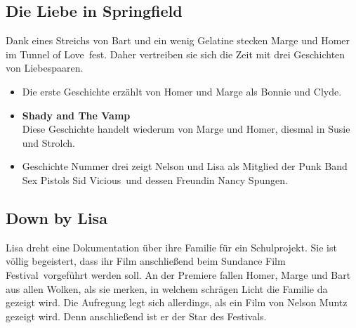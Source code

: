 

\subsection{Die Liebe in Springfield}
Dank eines Streichs von Bart und ein wenig Gelatine stecken Marge und Homer im \glqq Tunnel of Love\grqq\ fest. Daher vertreiben sie sich die Zeit mit drei Geschichten von Liebespaaren.
\begin{itemize}
	\item Die erste Geschichte erzählt von Homer und Marge als \glqq Bonnie und Clyde\grqq .
	\item \textbf{Shady and The Vamp}\\ Diese Geschichte handelt wiederum von Marge und Homer, diesmal in \glqq Susie und Strolch\grqq .
	\item Geschichte Nummer drei zeigt Nelson und Lisa als Mitglied der Punk Band Sex Pistols \glqq Sid Vicious\grqq\ und dessen Freundin \glqq Nancy Spungen\grqq . 
\end{itemize}


\subsection{Down by Lisa}\label{KABF11}
Lisa dreht eine Dokumentation über ihre Familie für ein Schulprojekt. Sie ist völlig begeistert, dass ihr Film anschließend beim \glqq Sundance Film Festival\grqq\ vorgeführt werden soll. An der Premiere fallen Homer, Marge und Bart aus allen Wolken, als sie merken, in welchem schrägen Licht die Familie da gezeigt wird. Die Aufregung legt sich allerdings, als ein Film von Nelson Muntz gezeigt wird. Denn anschließend ist er der Star des Festivals. 

